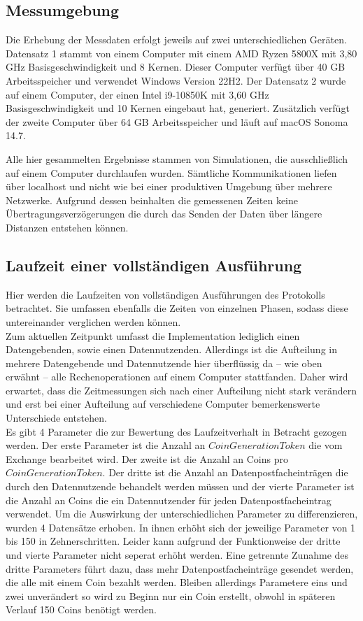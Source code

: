 \documentclass[
	fontsize=12pt,
	headings=small,
	parskip=half,           %
	bibliography=totoc,
	numbers=noenddot,       %
	open=any,               %
]{scrreprt}
\begin{document}
\subsection{Messumgebung}
\label{subsec:timeMessureComputer}
Die Erhebung der Messdaten erfolgt jeweils auf zwei unterschiedlichen Geräten. Datensatz 1 stammt von einem Computer mit einem AMD Ryzen 5800X mit 3,80 GHz Basisgeschwindigkeit und 8 Kernen. Dieser Computer verfügt über 40 GB Arbeitsspeicher und verwendet Windows Version 22H2. Der Datensatz 2 wurde auf einem Computer, der einen Intel i9-10850K mit 3,60 GHz Basisgeschwindigkeit und 10 Kernen eingebaut hat, generiert. Zusätzlich verfügt der zweite Computer über 64 GB Arbeitsspeicher und läuft auf macOS Sonoma 14.7.

Alle hier gesammelten Ergebnisse stammen von Simulationen, die ausschließlich auf einem Computer durchlaufen wurden. Sämtliche Kommunikationen liefen über localhost und nicht wie bei einer produktiven Umgebung über mehrere Netzwerke. Aufgrund dessen beinhalten die gemessenen Zeiten keine Übertragungsverzögerungen die durch das Senden der Daten über längere Distanzen entstehen können.

\subsection{Laufzeit einer vollständigen Ausführung}
Hier werden die Laufzeiten von vollständigen Ausführungen des Protokolls betrachtet. Sie umfassen ebenfalls die Zeiten von einzelnen Phasen, sodass diese untereinander verglichen werden können.\\

Zum aktuellen Zeitpunkt umfasst die Implementation lediglich einen Datengebenden, sowie einen Datennutzenden. Allerdings ist die Aufteilung in mehrere Datengebende und Datennutzende hier überflüssig da -- wie oben erwähnt -- alle Rechenoperationen auf einem Computer stattfanden. Daher wird erwartet, dass die Zeitmessungen sich nach einer Aufteilung nicht stark verändern und erst bei einer Aufteilung auf verschiedene Computer bemerkenswerte Unterschiede entstehen.\\

Es gibt 4 Parameter die zur Bewertung des Laufzeitverhalt in Betracht gezogen werden. Der erste Parameter ist die Anzahl an $CoinGenerationToken$ die vom Exchange bearbeitet wird. Der zweite ist die Anzahl an Coins pro $CoinGenerationToken$. Der dritte ist die Anzahl an Datenpostfacheinträgen die durch den Datennutzende behandelt werden müssen und der vierte Parameter ist die Anzahl an Coins die ein Datennutzender für jeden Datenpostfacheintrag verwendet. Um die Auswirkung der unterschiedlichen Parameter zu differenzieren, wurden 4 Datensätze erhoben. In ihnen erhöht sich der jeweilige Parameter von 1 bis 150 in Zehnerschritten. Leider kann aufgrund der Funktionweise der dritte und vierte Parameter nicht seperat erhöht werden. Eine getrennte Zunahme des dritte Parameters führt dazu, dass mehr Datenpostfacheinträge gesendet werden, die alle mit einem Coin bezahlt werden. Bleiben allerdings Parametere eins und zwei unverändert so wird zu Beginn nur ein Coin erstellt, obwohl in späteren Verlauf 150 Coins benötigt werden.\\
\end{document}
